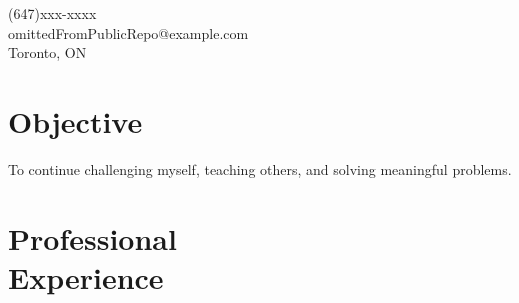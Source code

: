 \documentclass[margin,line]{resume}
\begin{document}
\sffamily %

{
	\sc
    \hfill (647)xxx-xxxx                  \vspace{0mm}\\\vspace{0mm}
    \hfill omittedFromPublicRepo@example.com            \vspace{0mm}\\\vspace{0mm}
    \hfill Toronto, ON                \vspace{0mm}\\\vspace{-10mm}
}

\begin{resume}

\vspace{1mm}

    \section{\mysidestyle \textbf{\large{O}\small{bjective}}}

	\hspace{-3mm}To continue challenging myself, teaching others, and solving meaningful problems.



\sectionline

    \section{\mysidestyle \textbf{\large{P}\small{rofessional\\Experience}}}


\end{resume}
\end{document}
